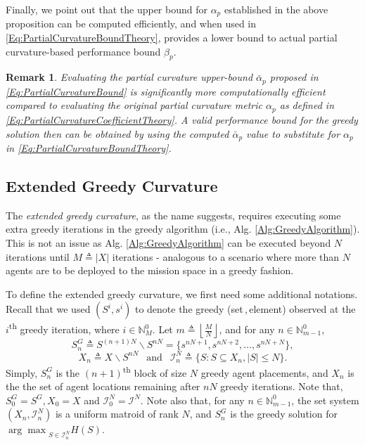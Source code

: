\documentclass[letterpaper, 10 pt, conference]{ieeeconf}
\newcommand{\N}{\mathbb{N}}
\newcommand{\tsup}[1]{\textsuperscript{#1}}
\newtheorem{remark}{Remark}
\begin{document}
Finally, we point out that the upper bound for $\alpha_p$ established in the above proposition can be computed efficiently, and when used in \eqref{Eq:PartialCurvatureBoundTheory}, provides a lower bound to actual partial curvature-based performance bound $\beta_p$. 


\begin{remark}
Evaluating the partial curvature upper-bound $\bar{\alpha}_p$ proposed in \eqref{Eq:PartialCurvatureBound} is significantly more computationally efficient compared to evaluating the original partial curvature metric $\alpha_p$ as defined in \eqref{Eq:PartialCurvatureCoefficientTheory}. A valid performance bound for the greedy solution then can be obtained by using the computed $\bar{\alpha}_p$ value to substitute for $\alpha_p$ in \eqref{Eq:PartialCurvatureBoundTheory}. 
\end{remark}

\subsection{Extended Greedy Curvature \cite{WelikalaJ02021}}\label{SubSec:ExtendedGreedyCurvature}

The \emph{extended greedy curvature}, as the name suggests, requires executing some extra greedy iterations in the greedy algorithm (i.e., Alg. \ref{Alg:GreedyAlgorithm}). This is not an issue as Alg. \ref{Alg:GreedyAlgorithm} can be executed beyond $N$ iterations until $M \triangleq \vert X \vert$ iterations - analogous to a scenario where more than $N$ agents are to be deployed to the mission space in a greedy fashion. 

To define the extended greedy curvature, we first need some additional notations. Recall that we used $(S^i,s^i)$ to denote the greedy (set\,,\,element) observed at the $i$\tsup{th} greedy iteration, where $i\in \N_M^0$. Let $m \triangleq \left \lfloor{\frac{M}{N}}\right \rfloor$, and for any $n\in \N_{m-1}^0$, 
\begin{equation}\label{Eq:GreedySolutionBlock}
    S^G_n \triangleq S^{(n+1)N} \backslash S^{nN} = \{s^{nN+1},s^{nN+2},\ldots,s^{nN+N}\}, 
\end{equation}
\begin{equation}\label{Eq:groundSetBlock}
X_n \triangleq X\backslash S^{nN} \ \ \mbox{ and } \ \  
\mathcal{I}_n^N \triangleq \{S:S \subseteq X_n, \vert S \vert \leq N\}.   
\end{equation}
Simply, $S^G_n$ is the $(n+1)$\tsup{th} block of size $N$ greedy agent placements, and $X_n$ is the the set of agent locations remaining after $nN$ greedy iterations. Note that, $S^G_0 = S^G, X_0 = X$ and $\mathcal{I}_0^N = \mathcal{I}^N$. Note also that, for any $n\in\N_{m-1}^0$, the set system $(X_n,\mathcal{I}_n^N)$ is a uniform matroid of rank $N$, and $S^G_n$ is the greedy solution for ${\arg\max}_{S\in\mathcal{I}_n^N} H(S)$.
\end{document}
